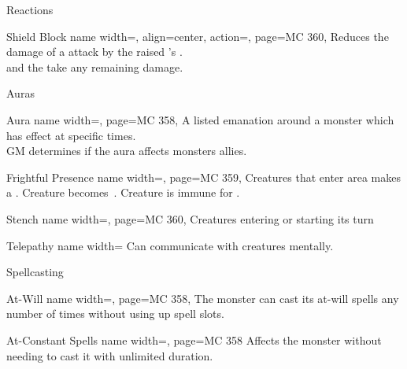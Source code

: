 \begin{PageFront}
\begin{Table}{Reactions}
        \begin{entry}{Shield Block}{%
            name width=\monsterLength,%
            align=center,%
            action=,%
            page=MC 360,%
        }
            Reduces the damage of a  attack by the raised 's \Hardness.\\
              and the  take any remaining damage.\hfill
        \end{entry}
    \end{Table}
    \begin{Table}{Auras}
        \begin{entry}{Aura}{%
            name width=\monsterLength,
            page=MC 358,%
        }
        A listed emanation around a monster which has effect at specific times. \\
        GM determines if the aura affects monsters allies.\hfill {}
        \end{entry}
        \begin{entry}{Frightful Presence}{%
            name width=\monsterLength,
            page=MC 359,%
        } \Aura \Emotion\Fear\Mental\;
        Creatures that enter area makes a \Will[][before=listed]. Creature becomes \Frightened\,.  \hfill Creature is immune for .
        \end{entry}
        \begin{entry}{Stench}{%
            name width=\monsterLength,
            page=MC 360,%
        }
            \Olfactory Creatures entering or starting its turn \Fortitude[][before=listed]  \hfill {}
        \end{entry}
        \begin{entry}{Telepathy}{%
            name width=\monsterLength
        }
        \Magical\Mental\; Can communicate with creatures mentally.
        \end{entry}
    \end{Table}
    \begin{Table}{Spellcasting}
        \begin{entry}{At-Will}{%
            name width=\monsterLength,
            page=MC 358,%
        }
            The monster can cast its at-will spells any number of times without using up spell slots.
        \end{entry}
        \begin{entry}{At-Constant Spells}{%
            name width=\monsterLength,
            page=MC 358
        }
            Affects the monster without needing to cast it with unlimited duration.\hfill {}
        \end{entry}


\end{Table}
\end{PageFront}
